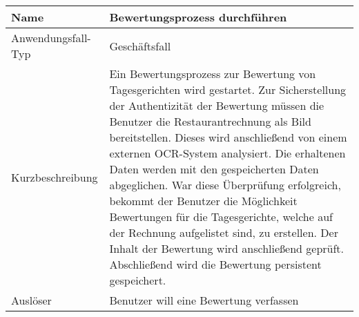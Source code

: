\begin{table}[H]
    \centering
    \label{bewertungsprozessDurchfuehren}
    \begin{tabularx}{\textwidth}{| l | X |}
        \hline
        Name               & Bewertungsprozess durchführen                                                                                                                                                                                                                                                                                                                                                                                                                                                                                                                                                                                       \\
        \hline
        Anwendungsfall-Typ & Geschäftsfall                                                                                                                                                                                                                                                                                                                                                                                                                                                                                                                                                                                                       \\
        \hline
        Kurzbeschreibung   & Ein Bewertungsprozess zur Bewertung von Tagesgerichten wird gestartet. Zur Sicherstellung der Authentizität der Bewertung müssen die Benutzer die Restaurantrechnung als Bild bereitstellen. Dieses wird anschließend von einem externen OCR-System analysiert. Die erhaltenen Daten werden mit den gespeicherten Daten abgeglichen. War diese Überprüfung erfolgreich, bekommt der Benutzer die Möglichkeit Bewertungen für die Tagesgerichte, welche auf der Rechnung aufgelistet sind, zu erstellen. Der Inhalt der Bewertung wird anschließend geprüft. Abschließend wird die Bewertung persistent gespeichert. \\
        \hline
        Auslöser           & Benutzer will eine Bewertung verfassen                                                                                                                                                                                                                                                                                                                                                                                                                                                                                                                                                                              \\

\end{tabularx}
\end{table}
